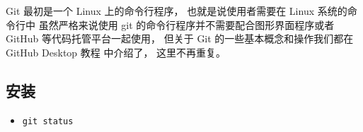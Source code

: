 
\begin{issues}
\issueDraft
\end{issues}


Git 最初是一个 Linux 上的命令行程序， 也就是说使用者需要在 Linux 系统的命令行中 虽然严格来说使用 git 的命令行程序并不需要配合图形界面程序或者 GitHub 等代码托管平台一起使用， 但关于 Git 的一些基本概念和操作我们都在 GitHub Desktop 教程 中介绍了， 这里不再重复。

\subsection{安装}

\begin{itemize}
\item \verb|git status|
\end{itemize}
